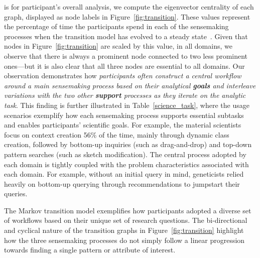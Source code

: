  is for participant's overall analysis,
 we compute the eigenvector centrality of each graph,
 displayed as node labels in Figure~\ref{fig:transition}.
 These values represent the percentage of time the participants
 spend in each of the sensemaking processes
 when the transition model has evolved to a steady state~\cite{pierre2011}.
 Given that nodes in Figure~\ref{fig:transition}
 are scaled by this value, in all domains,
 we observe that there is always a prominent node
 connected to two less prominent ones---but it is also clear
 that all three nodes are essential to all domains.
 Our observation demonstrates how \emph{participants
 often construct a central workflow
 around a main sensemaking process based on their analytical \textbf{goals}
 and interleave variations with the two other \textbf{support} processes as they iterate on the analytic task}. This finding is further illustrated in Table~\ref{science_task}, where the usage scenarios exemplify how each sensemaking process supports essential subtasks and enables participants' scientific goals. For example, the material scientists focus on context creation 56\% of the time, mainly through dynamic class creation, followed by bottom-up inquiries (such as drag-and-drop) and top-down pattern searches (such as sketch modification).
 The central process adopted by each domain
 is tightly coupled with the problem characteristics associated with each domain. For example, without an initial query in mind,
 geneticists relied heavily on bottom-up querying
 through recommendations to jumpstart their queries.
 \par The Markov transition model exemplifies how participants
 adopted a diverse set of workflows
 based on their unique set of research questions. The bi-directional and cyclical nature
 of the transition graphs in Figure~\ref{fig:transition} highlight how the three sensemaking processes do not simply follow a linear progression towards finding a single pattern or attribute of interest. %
